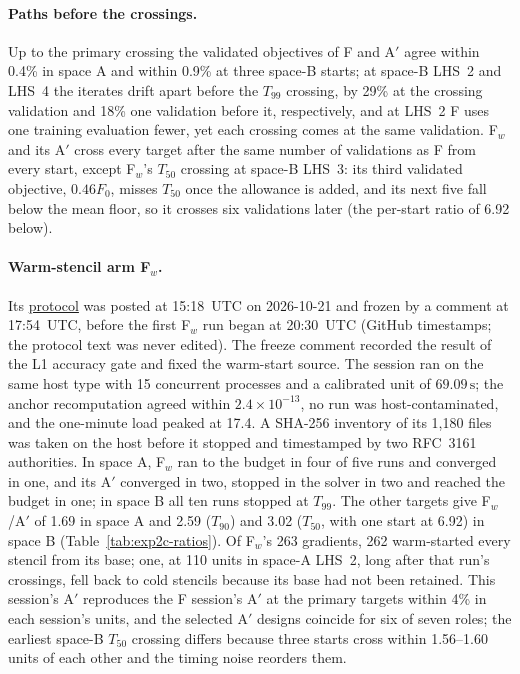 \documentclass{anvil-paper}
\begin{document}
\paragraph{Paths before the crossings.}
Up to the primary crossing the validated objectives of F and A$'$ agree
within 0.4\% in space A and within 0.9\% at three space-B starts; at
space-B LHS~2 and LHS~4 the iterates drift apart before the $T_{99}$
crossing, by 29\% at the crossing validation and 18\% one validation
before it, respectively, and at LHS~2 F uses one training evaluation fewer, yet each
crossing comes at the same validation. F$_w$ and its A$'$ cross every
target after the same number of validations as F from every start, except
F$_w$'s $T_{50}$ crossing at space-B LHS~3: its third validated objective,
$0.46F_0$, misses $T_{50}$ once the allowance is added, and its next five
fall below the mean floor, so it crosses six validations later (the
per-start ratio of 6.92 below).

\paragraph{Warm-stencil arm F$_w$.}
Its \href{https://github.com/rjwalters/geode-fem/issues/1224}{protocol} was
posted at 15:18~UTC on 2026-10-21 and frozen by a comment at 17:54~UTC,
before the first F$_w$ run began at 20:30~UTC (GitHub timestamps; the
protocol text was never edited). The freeze comment recorded the result of
the L1 accuracy gate and fixed the warm-start source. The session ran on the same host type with
15 concurrent processes and a calibrated unit of $69.09\,\mathrm{s}$; the
anchor recomputation agreed within $2.4\times10^{-13}$, no run was
host-contaminated, and the one-minute load peaked at 17.4. A SHA-256
inventory of its 1,180 files was taken on the host before it stopped and
timestamped by two RFC~3161 authorities. In space A, F$_w$ ran to the budget
in four of five runs and converged in one, and its A$'$ converged in two,
stopped in the solver in two and reached the budget in one; in space B all
ten runs stopped at $T_{99}$. The other targets give F$_w$/A$'$ of 1.69 in
space A and 2.59 ($T_{90}$) and 3.02 ($T_{50}$, with one start at 6.92) in
space B (Table~\ref{tab:exp2c-ratios}). Of F$_w$'s 263 gradients, 262
warm-started every stencil from its base; one, at 110 units in space-A
LHS~2, long after that run's crossings, fell back to cold stencils because
its base had not been retained.
This session's A$'$ reproduces the F session's A$'$ at the primary targets
within 4\% in each session's units, and the selected A$'$ designs coincide
for six of seven roles; the earliest space-B $T_{50}$ crossing differs
because three starts cross within 1.56--1.60 units of each other and the
timing noise reorders them.
\end{document}
